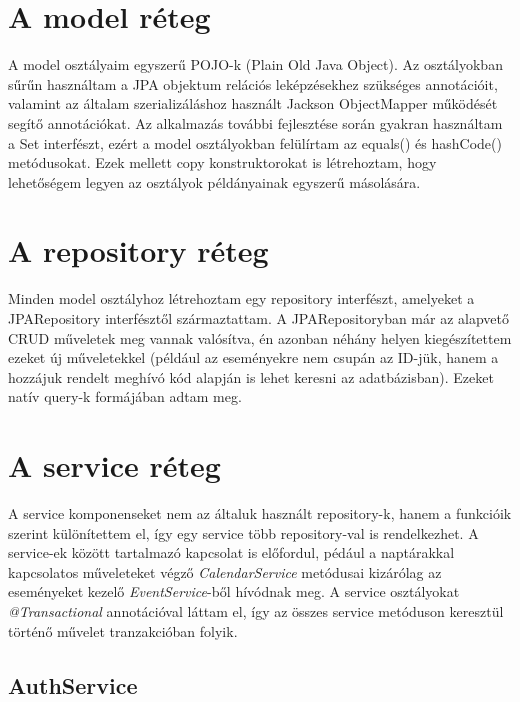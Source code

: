\documentclass[a4paper,12pt]{report}
\theoremstyle{definition}
\theoremstyle{remark}
\begin{document}
\section{A model réteg}

A model osztályaim egyszerű POJO-k (Plain Old Java Object). Az osztályokban sűrűn használtam a JPA objektum relációs leképzésekhez szükséges annotációit, valamint az általam szerializáláshoz használt Jackson ObjectMapper működését segítő annotációkat. Az alkalmazás további fejlesztése során gyakran használtam a Set interfészt, ezért a model osztályokban felülírtam az equals() és hashCode() metódusokat. Ezek mellett copy konstruktorokat is létrehoztam, hogy lehetőségem legyen az osztályok példányainak egyszerű másolására.

\section{A repository réteg}

Minden model osztályhoz létrehoztam egy repository interfészt, amelyeket a JPARepository interfésztől származtattam. A JPARepositoryban már az alapvető CRUD műveletek meg vannak valósítva, én azonban néhány helyen kiegészítettem ezeket új műveletekkel (például az eseményekre nem csupán az ID-jük, hanem a hozzájuk rendelt meghívó kód alapján is lehet keresni az adatbázisban). Ezeket natív query-k formájában adtam meg.

\section{A service réteg}

A service komponenseket nem az általuk használt repository-k, hanem a funkcióik szerint különítettem el, így egy service több repository-val is rendelkezhet. A service-ek között tartalmazó kapcsolat is előfordul, pédául a naptárakkal kapcsolatos műveleteket végző \textit{CalendarService} metódusai kizárólag az eseményeket kezelő \textit{EventService}-ből hívódnak meg. A service osztályokat \textit{@Transactional} annotációval láttam el, így az összes service metóduson keresztül történő művelet tranzakcióban folyik.

\subsection{AuthService}
\end{document}
